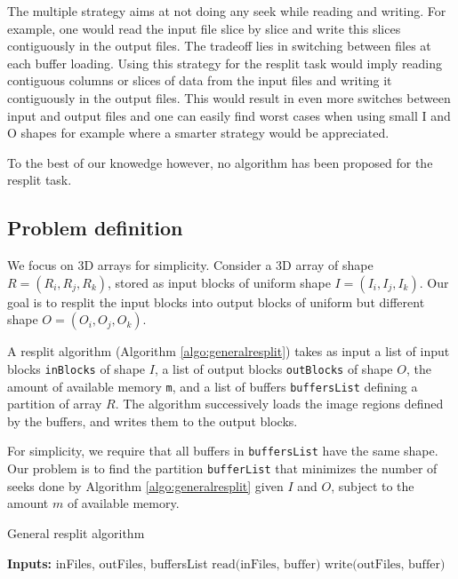 \documentclass[conference]{IEEEtran}
\begin{document}
The multiple strategy aims at not doing any seek while reading and writing. For
example, one would read the input file slice by slice and write this slices
contiguously in the output files. The tradeoff lies in switching between files
at each buffer loading. Using this strategy for the resplit task would imply
reading contiguous columns or slices of data from the input files and writing it
contiguously in the output files. This would result in even more switches
between input and output files and one can easily find worst cases when using
small I and O shapes for example where a smarter strategy would be appreciated.

To the best of our knowedge however, no algorithm has been proposed for the resplit task.

\subsection{Problem definition}
We focus on 3D arrays for simplicity. Consider a 3D array of shape $R =
(R_i, R_j, R_k)$, stored as input blocks of uniform shape $I =
(I_i, I_j, I_k)$. Our goal is to resplit the input blocks into output
blocks of uniform but different shape $O = (O_i, O_j, O_k)$.

A resplit algorithm (Algorithm \ref{algo:generalresplit}) takes as input a
list of input blocks \texttt{inBlocks} of shape $I$, a list of output
blocks \texttt{outBlocks} of shape $O$, the amount of available memory
\texttt{m}, and a list of buffers \texttt{buffersList} defining a partition
of array $R$. The algorithm successively loads the image regions defined by
the buffers, and writes them to the output blocks.

For simplicity, we require that all buffers in \texttt{buffersList} have
the same shape. Our problem is to find the partition \texttt{bufferList}
that minimizes the number of seeks done by Algorithm
\ref{algo:generalresplit} given $I$ and $O$, subject to the amount $m$
of available memory.

\begin{algorithm}[H]
  \caption{General resplit algorithm}
  \label{algo:generalresplit}
  \begin{algorithmic}
    \STATE \textbf{Inputs:} {inFiles, outFiles, buffersList}
      \STATE $\textrm{read(inFiles, buffer)}$
      \STATE $\textrm{write(outFiles, buffer)}$
    \ENDFOR

  \end{algorithmic}
\end{algorithm}
\end{document}
